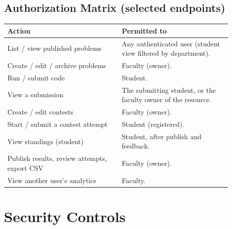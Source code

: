 \documentclass[12pt,a4paper,oneside]{report}
\begin{document}
\section{Authorization Matrix (selected endpoints)}
\begin{longtable}{@{}p{0.46\linewidth} p{0.44\linewidth}@{}}
\toprule
\textbf{Action} & \textbf{Permitted to}\\
\midrule
\endhead
List / view published problems & Any authenticated user (student view filtered by department).\\
Create / edit / archive problems & Faculty (owner).\\
Run / submit code & Student.\\
View a submission & The submitting student, or the faculty owner of the resource.\\
Create / edit contests & Faculty (owner).\\
Start / submit a contest attempt & Student (registered).\\
View standings (student) & Student, after publish and feedback.\\
Publish results, review attempts, export CSV & Faculty (owner).\\
View another user's analytics & Faculty.\\
\bottomrule
\end{longtable}

\chapter{Security Controls}
\end{document}
